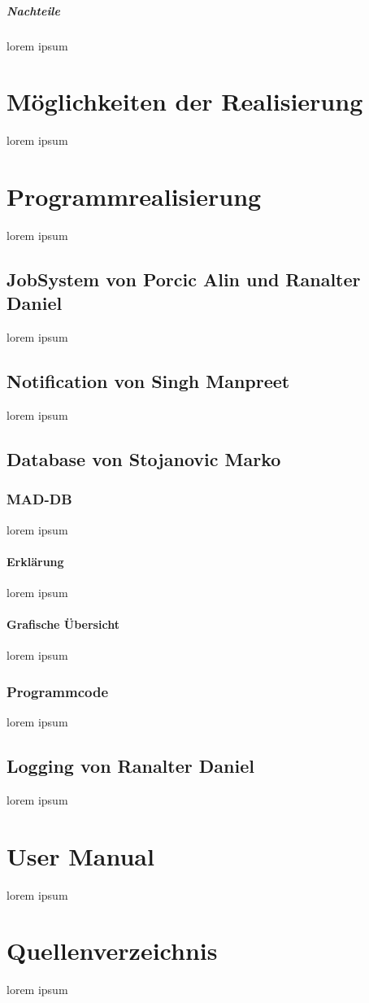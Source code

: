 \documentclass[10pt,a4paper]{report}
\begin{document}
\paragraph{Nachteile}
lorem ipsum
\chapter{Möglichkeiten der Realisierung}
lorem ipsum
\chapter{Programmrealisierung}
lorem ipsum
\section{JobSystem von Porcic Alin und Ranalter Daniel}
lorem ipsum
\section{Notification von Singh Manpreet}
lorem ipsum
\section{Database von Stojanovic Marko}
\subsection{MAD-DB}
lorem ipsum
\subsubsection{Erklärung}
lorem ipsum
\subsubsection{Grafische Übersicht}
lorem ipsum
\subsection{Programmcode}
lorem ipsum
\section{Logging von Ranalter Daniel}
lorem ipsum
\chapter{User Manual}
lorem ipsum 
\chapter{Quellenverzeichnis}
lorem ipsum 
\end{document}
